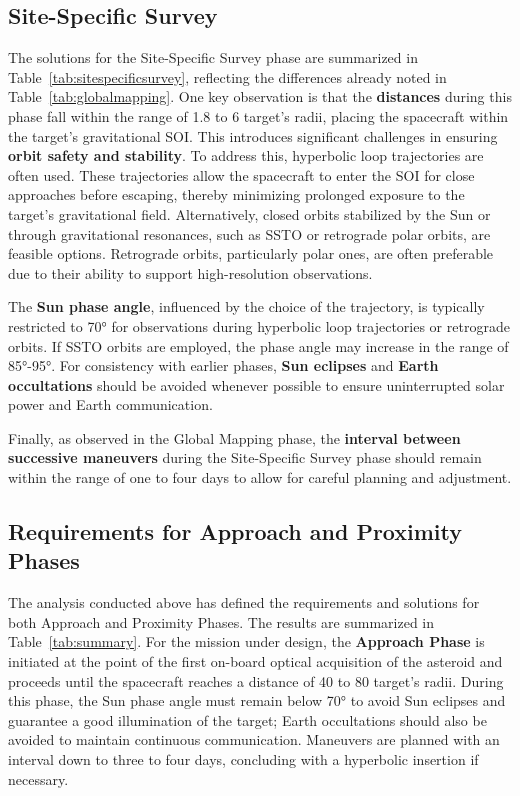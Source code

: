 \documentclass{Configuration_gigi/PoliMi3i_thesis}
\begin{document}
\subsection{Site-Specific Survey}\label{Ssec: Site-Specific Survey}

The solutions for the Site-Specific Survey phase are summarized in Table~\ref{tab:sitespecificsurvey}, reflecting the differences already noted in Table~\ref{tab:globalmapping}. One key observation is that the \textbf{distances} during this phase fall within the range of 1.8 to 6 target's radii, placing the spacecraft within the target’s gravitational SOI. This introduces significant challenges in ensuring \textbf{orbit safety and stability}. To address this, hyperbolic loop trajectories are often used. These trajectories allow the spacecraft to enter the SOI for close approaches before escaping, thereby minimizing prolonged exposure to the target's gravitational field. Alternatively, closed orbits stabilized by the Sun or through gravitational resonances, such as SSTO or retrograde polar orbits, are feasible options. Retrograde orbits, particularly polar ones, are often preferable due to their ability to support high-resolution observations.

The \textbf{Sun phase angle}, influenced by the choice of the trajectory, is typically restricted to 70° for observations during hyperbolic loop trajectories or retrograde orbits. If SSTO orbits are employed, the phase angle may increase in the range of 85°-95°. For consistency with earlier phases, \textbf{Sun eclipses} and \textbf{Earth occultations} should be avoided whenever possible to ensure uninterrupted solar power and Earth communication.

Finally, as observed in the Global Mapping phase, the \textbf{interval between successive maneuvers} during the Site-Specific Survey phase should remain within the range of one to four days to allow for careful planning and adjustment.


\subsection{Requirements for Approach and Proximity Phases}\label{Ssec:Requirements for Approach and Proximity Phases}

The analysis conducted above has defined the requirements and solutions for both Approach and Proximity Phases. The results are summarized in Table~\ref{tab:summary}. For the mission under design, the \textbf{Approach Phase} is initiated at the point of the first on-board optical acquisition of the asteroid and proceeds until the spacecraft reaches a distance of 40 to 80 target's radii. During this phase, the Sun phase angle must remain below 70° to avoid Sun eclipses and guarantee a good illumination of the target; Earth occultations should also be avoided to maintain continuous communication. Maneuvers are planned with an interval down to three to four days, concluding with a hyperbolic insertion if necessary.
\end{document}
